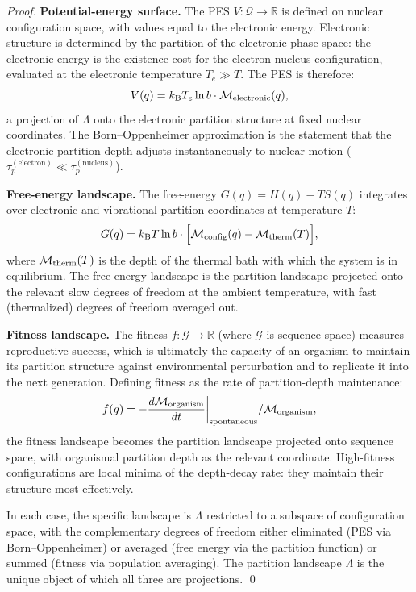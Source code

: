 \begin{proof}
\textbf{Potential-energy surface.} The PES $V: \mathcal{Q} \to \mathbb{R}$ is
defined on nuclear configuration space, with values equal to the electronic
energy. Electronic structure is determined by the partition of the electronic
phase space: the electronic energy is the existence cost for the electron-nucleus
configuration, evaluated at the electronic temperature $T_e \gg T$. The PES is
therefore:
\begin{equation}
  V(q) = k_{\mathrm{B}} T_e \ln b \cdot \mathcal{M}_{\mathrm{electronic}}(q),
\end{equation}
a projection of $\Lambda$ onto the electronic partition structure at fixed
nuclear coordinates. The Born--Oppenheimer approximation is the statement that
the electronic partition depth adjusts instantaneously to nuclear motion
($\tau_p^{(\text{electron})} \ll \tau_p^{(\text{nucleus})}$).

\textbf{Free-energy landscape.} The free-energy $G(q) = H(q) - TS(q)$
integrates over electronic and vibrational partition coordinates at temperature
$T$:
\begin{equation}
  G(q) = k_{\mathrm{B}} T \ln b \cdot \Bigl[\mathcal{M}_{\mathrm{config}}(q) - \mathcal{M}_{\mathrm{therm}}(T)\Bigr],
\end{equation}
where $\mathcal{M}_{\mathrm{therm}}(T)$ is the depth of the thermal bath with which
the system is in equilibrium. The free-energy landscape is the partition
landscape projected onto the relevant slow degrees of freedom at the ambient
temperature, with fast (thermalized) degrees of freedom averaged out.

\textbf{Fitness landscape.} The fitness $f: \mathcal{G} \to \mathbb{R}$
(where $\mathcal{G}$ is sequence space) measures reproductive success, which
is ultimately the capacity of an organism to maintain its partition structure
against environmental perturbation and to replicate it into the next generation.
Defining fitness as the rate of partition-depth maintenance:
\begin{equation}
  f(g) = -\frac{d\mathcal{M}_{\mathrm{organism}}}{dt}\bigg|_{\mathrm{spontaneous}} / \mathcal{M}_{\mathrm{organism}},
\end{equation}
the fitness landscape becomes the partition landscape projected onto sequence
space, with organismal partition depth as the relevant coordinate. High-fitness
configurations are local minima of the depth-decay rate: they maintain their
structure most effectively.

In each case, the specific landscape is $\Lambda$ restricted to a subspace of
configuration space, with the complementary degrees of freedom either
eliminated (PES via Born--Oppenheimer) or averaged (free energy via the
partition function) or summed (fitness via population averaging). The partition
landscape $\Lambda$ is the unique object of which all three are projections. \qed
\end{proof}

